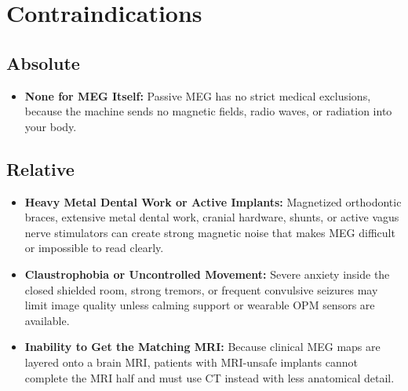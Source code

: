 \section{Contraindications}

\subsection{Absolute}
\begin{itemize}
  \item \textbf{None for MEG Itself:} Passive MEG has no strict medical exclusions, because the machine sends no magnetic fields, radio waves, or radiation into your body.
\end{itemize}

\subsection{Relative}
\begin{itemize}
  \item \textbf{Heavy Metal Dental Work or Active Implants:} Magnetized orthodontic braces, extensive metal dental work, cranial hardware, shunts, or active vagus nerve stimulators can create strong magnetic noise that makes MEG difficult or impossible to read clearly.
  \item \textbf{Claustrophobia or Uncontrolled Movement:} Severe anxiety inside the closed shielded room, strong tremors, or frequent convulsive seizures may limit image quality unless calming support or wearable OPM sensors are available.
  \item \textbf{Inability to Get the Matching MRI:} Because clinical MEG maps are layered onto a brain MRI, patients with MRI-unsafe implants cannot complete the MRI half and must use CT instead with less anatomical detail.
\end{itemize}

